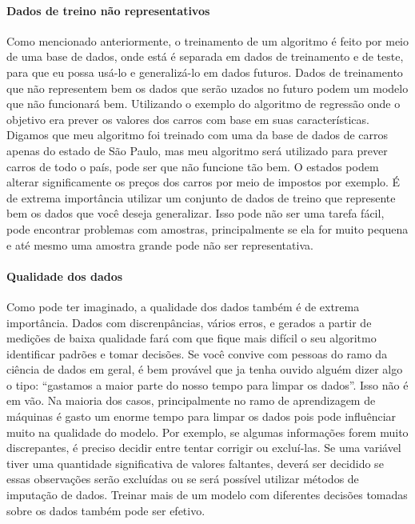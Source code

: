 \documentclass[
  letterpaper,
  DIV=11,
  numbers=noendperiod]{scrreprt}
\let\oldparagraph\paragraph
\renewcommand{\paragraph}[1]{\oldparagraph{#1}\mbox{}}
\begin{document}
\hypertarget{dados-de-treino-nuxe3o-representativos}{%
\paragraph{Dados de treino não
representativos}\label{dados-de-treino-nuxe3o-representativos}}

Como mencionado anteriormente, o treinamento de um algoritmo é feito por
meio de uma base de dados, onde está é separada em dados de treinamento
e de teste, para que eu possa usá-lo e generalizá-lo em dados futuros.
Dados de treinamento que não representem bem os dados que serão uzados
no futuro podem um modelo que não funcionará bem. Utilizando o exemplo
do algoritmo de regressão onde o objetivo era prever os valores dos
carros com base em suas características. Digamos que meu algoritmo foi
treinado com uma da base de dados de carros apenas do estado de São
Paulo, mas meu algoritmo será utilizado para prever carros de todo o
país, pode ser que não funcione tão bem. O estados podem alterar
significamente os preços dos carros por meio de impostos por exemplo. É
de extrema importância utilizar um conjunto de dados de treino que
represente bem os dados que você deseja generalizar. Isso pode não ser
uma tarefa fácil, pode encontrar problemas com amostras, principalmente
se ela for muito pequena e até mesmo uma amostra grande pode não ser
representativa.

\hypertarget{qualidade-dos-dados}{%
\paragraph{Qualidade dos dados}\label{qualidade-dos-dados}}

Como pode ter imaginado, a qualidade dos dados também é de extrema
importância. Dados com discrenpâncias, vários erros, e gerados a partir
de medições de baixa qualidade fará com que fique mais difícil o seu
algoritmo identificar padrões e tomar decisões. Se você convive com
pessoas do ramo da ciência de dados em geral, é bem provável que ja
tenha ouvido alguém dizer algo o tipo: ``gastamos a maior parte do nosso
tempo para limpar os dados''. Isso não é em vão. Na maioria dos casos,
principalmente no ramo de aprendizagem de máquinas é gasto um enorme
tempo para limpar os dados pois pode influênciar muito na qualidade do
modelo. Por exemplo, se algumas informações forem muito discrepantes, é
preciso decidir entre tentar corrigir ou excluí-las. Se uma variável
tiver uma quantidade significativa de valores faltantes, deverá ser
decidido se essas observações serão excluídas ou se será possível
utilizar métodos de imputação de dados. Treinar mais de um modelo com
diferentes decisões tomadas sobre os dados também pode ser efetivo.
\end{document}
